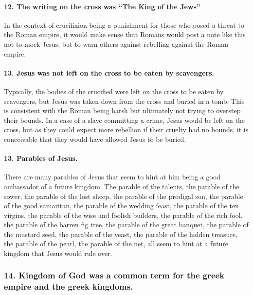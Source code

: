 \paragraph{12.
The writing on the cross was ``The King of the Jews''}\label{par:the-writing-on-the-cross-was-the-king-of-the-jews}

In the context of crucifixion being a punishment for those who posed a threat to the Roman empire, it would make sense that Romans would post a note like this not to mock Jesus, but to warn others against rebelling against the Roman empire.

\paragraph{13.
Jesus was not left on the cross to be eaten by scavengers.}\label{par:jesus-was-not-left-on-the-cross-to-be-eaten-by-scavengers.}

Typically, the bodies of the crucified were left on the cross to be eaten by scavengers, but Jesus was taken down from the cross and buried in a tomb.
This is consistent with the Roman being harsh but ultimately not trying to overstep their bounds.
In a case of a slave committing a crime, Jesus would be left on the cross, but as they could expect more rebellion if their cruelty had no bounds, it is conceivable that they would have allowed Jesus to be buried.

\paragraph{13.
Parables of Jesus.}\label{par:parables-of-jesus.}

There are many parables of Jesus that seem to hint at him being a good ambassador of a future kingdom.
The parable of the talents, the parable of the sower, the parable of the lost sheep, the parable of the prodigal son, the parable of the good samaritan, the parable of the wedding feast, the parable of the ten virgins, the parable of the wise and foolish builders, the parable of the rich fool, the parable of the barren fig tree, the parable of the great banquet, the parable of the mustard seed, the parable of the yeast, the parable of the hidden treasure, the parable of the pearl, the parable of the net, all seem to hint at a future kingdom that Jesus would rule over.

\subsubsection{14.
Kingdom of God was a common term for the greek empire and the greek kingdoms.}\label{subsubsec:kingdom-of-god-was-a-common-term-for-the-greek-empire-and-the-greek-kingdoms.}


